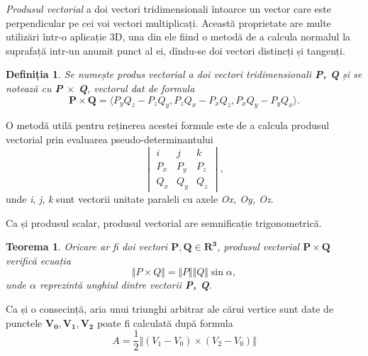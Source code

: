\textit{Produsul vectorial} a doi vectori tridimensionali întoarce un vector
care este perpendicular pe cei voi vectori multiplicați. Această proprietate are
multe utilizări într-o aplicație 3D, una din ele fiind o metodă de a calcula
normalul la suprafață intr-un anumit punct al ei, dîndu-se doi vectori distincți
și tangenți.

\newtheorem{crossproduct_def}[vector_arith]{Definiția}
\begin{crossproduct_def}
Se numește produs vectorial a doi vectori tridimensionali \textbf{P, Q} și se
notează cu \textbf{P $\times$ Q}, vectorul dat de formula
\begin{equation}
\label{eq:vec:12}
\mathbf{P \times Q} = \langle P_yQ_z - P_zQ_y, P_zQ_x - P_xQ_z, P_xQ_y - P_yQ_x
\rangle.
\end{equation}
\end{crossproduct_def}
O metodă utilă pentru reținerea acestei formule este de a calcula produsul
vectorial prin evaluarea pseudo-determinantului
\begin{equation}
\begin{vmatrix}
i & j & k \\
P_x & P_y & P_z \\
Q_x & Q_y & Q_z
\end{vmatrix},
\end{equation} unde \textit{i}, \textit{j}, \textit{k} sunt vectorii unitate
paraleli cu axele \textit{Ox, Oy, Oz}.

\indent
Ca și produsul scalar, produsul vectorial are semnificație trigonometrică.

\newtheorem{crossproduct_trig}[vector_arith]{Teorema}
\begin{crossproduct_trig}
Oricare ar fi doi vectori $\mathbf{P, Q \in R^3}$, produsul vectorial
$\mathbf{P \times Q}$ verifică ecuația
\begin{equation}
\label{eq:vec:13}
\Vert P \times Q \Vert = \Vert P \Vert \Vert Q \Vert \sin \alpha,
\end{equation} unde $\alpha$ reprezintă unghiul dintre vectorii \textbf{P, Q}.
\end{crossproduct_trig}

Ca și o consecință, aria unui triunghi arbitrar ale cărui vertice sunt
date de punctele $\mathbf{V_0, V_1, V_2}$ poate fi calculată după formula
\begin{equation}
\label{eq:vec:cross_tri_area}
A = \frac{1}{2} \Vert (V_1 - V_0) \times (V_2 - V_0) \Vert
\end{equation}

